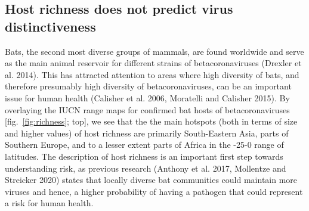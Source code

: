 \documentclass[11pt]{article}
\begin{document}
\hypertarget{host-richness-does-not-predict-virus-distinctiveness}{%
\subsection{Host richness does not predict virus
distinctiveness}\label{host-richness-does-not-predict-virus-distinctiveness}}

Bats, the second most diverse groups of mammals, are found worldwide and
serve as the main animal reservoir for different strains of
betacoronaviruses (Drexler et al. 2014). This has attracted attention to
areas where high diversity of bats, and therefore presumably high
diversity of betacoronaviruses, can be an important issue for human
health (Calisher et al. 2006, Moratelli and Calisher 2015). By
overlaying the IUCN range maps for confirmed bat hosts of
betacoronaviruses {[}fig.~\ref{fig:richness}; top{]}, we see that the
the main hotspots (both in terms of size and higher values) of host
richness are primarily South-Eastern Asia, parts of Southern Europe, and
to a lesser extent parts of Africa in the -25-0 range of latitudes. The
description of host richness is an important first step towards
understanding risk, as previous research (Anthony et al. 2017, Mollentze
and Streicker 2020) states that locally diverse bat communities could
maintain more viruses and hence, a higher probability of having a
pathogen that could represent a risk for human health.
\end{document}
